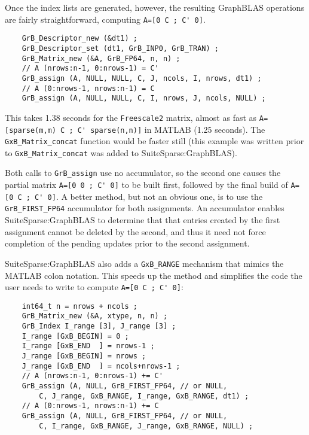 \documentclass[12pt]{article}
\begin{document}
Once the index lists are generated, however, the resulting GraphBLAS operations
are fairly straightforward, computing \verb"A=[0 C ; C' 0]".

    \vspace{-0.05in}
    {\footnotesize
    \begin{verbatim}
    GrB_Descriptor_new (&dt1) ;
    GrB_Descriptor_set (dt1, GrB_INP0, GrB_TRAN) ;
    GrB_Matrix_new (&A, GrB_FP64, n, n) ;
    // A (nrows:n-1, 0:nrows-1) = C'
    GrB_assign (A, NULL, NULL, C, J, ncols, I, nrows, dt1) ;
    // A (0:nrows-1, nrows:n-1) = C
    GrB_assign (A, NULL, NULL, C, I, nrows, J, ncols, NULL) ; \end{verbatim}}

This takes 1.38 seconds for the \verb'Freescale2' matrix, almost as fast as \newline
\verb"A=[sparse(m,m) C ; C' sparse(n,n)]" in MATLAB (1.25 seconds).
The \verb'GxB_Matrix_concat' function would be faster still (this example
was written prior to \verb'GxB_Matrix_concat' was added to SuiteSparse:GraphBLAS).

Both calls to \verb'GrB_assign' use no accumulator, so the second one
causes the partial matrix \verb"A=[0 0 ; C' 0]" to be built first, followed by
the final build of \verb"A=[0 C ; C' 0]".  A better method, but not an obvious
one, is to use the \verb'GrB_FIRST_FP64' accumulator for both assignments.  An
accumulator enables SuiteSparse:GraphBLAS to determine that that entries
created by the first assignment cannot be deleted by the second, and thus it
need not force completion of the pending updates prior to the second
assignment.

SuiteSparse:GraphBLAS also adds a \verb'GxB_RANGE' mechanism that mimics
the MATLAB colon notation.  This speeds up the method and simplifies the
code the user needs to write to compute \verb"A=[0 C ; C' 0]":

    \vspace{-0.05in}
    {\footnotesize
    \begin{verbatim}
    int64_t n = nrows + ncols ;
    GrB_Matrix_new (&A, xtype, n, n) ;
    GrB_Index I_range [3], J_range [3] ;
    I_range [GxB_BEGIN] = 0 ;
    I_range [GxB_END  ] = nrows-1 ;
    J_range [GxB_BEGIN] = nrows ;
    J_range [GxB_END  ] = ncols+nrows-1 ;
    // A (nrows:n-1, 0:nrows-1) += C'
    GrB_assign (A, NULL, GrB_FIRST_FP64, // or NULL,
        C, J_range, GxB_RANGE, I_range, GxB_RANGE, dt1) ;
    // A (0:nrows-1, nrows:n-1) += C
    GrB_assign (A, NULL, GrB_FIRST_FP64, // or NULL,
        C, I_range, GxB_RANGE, J_range, GxB_RANGE, NULL) ; \end{verbatim}}
\end{document}
